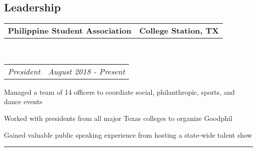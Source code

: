 \documentclass[10pt,letterpaper]{article}
\makeatletter
\newenvironment{indentsection}[1]%
{\begin{list}{}%
	{\setlength{\leftmargin}{#1}}%
	\item[]%
}
{\end{list}}
\newcommand{\headerrow}[2]
{\begin{tabular*}{\linewidth}{l@{\extracolsep{\fill}}r}
	#1 &
	#2 \\
\end{tabular*}}
\makeatother
\begin{document}
\subsection*{Leadership}
\begin{indentsection}{\parindent}
	\vspace{-0.4em}
	\headerrow
		{\textbf{Philippine Student Association}}
		{\textbf{College Station, TX}}
		\\
	\headerrow
		{\emph{President}}
		{\emph{August 2018 - Present}}
	\begin{itemize*}
		\item Managed a team of 14 officers to coordiate social, philanthropic, sports, and dance 			events
		\item Worked with presidents from all major Texas colleges to organize Goodphil 
		\item Gained valuable public speaking experience from hosting a state-wide talent show
	\end{itemize*}

\end{indentsection}

\hrule
\vspace{-0.8em}
\end{document}
